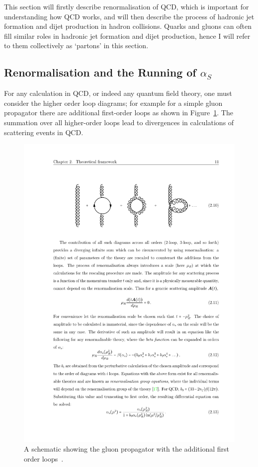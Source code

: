 This section will firstly describe renormalisation of QCD, which is important for understanding how QCD works,
and will then describe the process of hadronic jet formation and dijet production in hadron collisions.
Quarks and gluons can often fill similar roles in hadronic jet formation and dijet production, hence I will refer to them collectively as `partons' in this section.

\subsection{Renormalisation and the Running of $\alpha_S$}
\label{sec:theo-qcd_dijet_running}

For any calculation in QCD, or indeed any quantum field theory, one must consider the higher order loop diagrams;
for example for a simple gluon propagator there are additional first-order loops as shown in Figure~\ref{fig:theo-qcd_gluon}.
The summation over all higher-order loops lead to divergences in calculations of scattering events in QCD.

\begin{figure}[!hbt]
  \begin{center}
    \includegraphics[width=0.7\linewidth, angle=0]{figs/Theory/qcd_gluon_loop.pdf}
  \end{center}
  \caption[A schematic showing the gluon propagator with the additional first order loops.]
  {A schematic showing the gluon propagator with the additional first order loops~\cite{det-thesis_kate}.}
  \label{fig:theo-qcd_gluon}
\end{figure}

